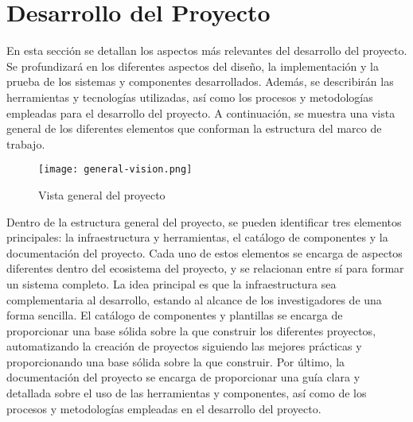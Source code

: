 \section{Desarrollo del Proyecto}
En esta sección se detallan los aspectos más relevantes del desarrollo del proyecto.
Se profundizará en los diferentes aspectos del diseño, la implementación y la
prueba de los sistemas y componentes desarrollados. Además, se describirán las
herramientas y tecnologías utilizadas, así como los procesos y metodologías
empleadas para el desarrollo del proyecto. A continuación, se muestra una vista general de los diferentes elementos
que conforman la estructura del marco de trabajo.

\begin{figure}[ht]
    \centering
    \texttt{[image: general-vision.png]}
    \caption{Vista general del proyecto}\label{fig:general-vision}
\end{figure}

Dentro de la estructura general del proyecto, se pueden identificar tres elementos
principales: la infraestructura y herramientas, el catálogo de componentes y la
documentación del proyecto. Cada uno de estos elementos se encarga de aspectos
diferentes dentro del ecosistema del proyecto, y se relacionan entre sí para formar
un sistema completo. La idea principal es que la infraestructura sea complementaria
al desarrollo, estando al alcance de los investigadores de una forma sencilla. El catálogo
de componentes y plantillas se encarga de proporcionar una base sólida sobre la que
construir los diferentes proyectos, automatizando la creación de proyectos siguiendo 
las mejores prácticas y proporcionando una base sólida sobre la que construir. Por último,
la documentación del proyecto se encarga de proporcionar una guía clara y detallada
sobre el uso de las herramientas y componentes, así como de los procesos y metodologías
empleadas en el desarrollo del proyecto.





\pagebreak